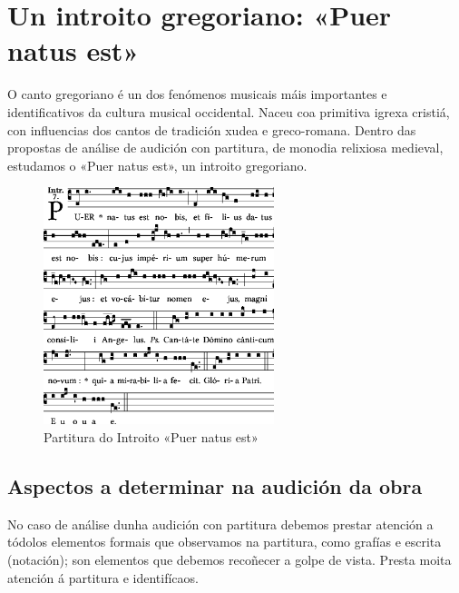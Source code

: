 %
%
\section{Un introito gregoriano: «Puer natus est»}
%
O canto gregoriano é un dos fenómenos musicais máis importantes e identificativos da cultura 
musical occidental. Naceu coa primitiva igrexa cristiá, con influencias dos cantos de tradición 
xudea e greco-romana.
%
Dentro das propostas de análise de audición con partitura, de monodia relixiosa medieval, estudamos o «Puer natus est», un introito gregoriano.

\vspace*{0.25cm}

\begin{figure}[h]
    \centering
    \includegraphics[width=0.60\textwidth]{figures/audicions/Puer-natus.eps}
    \caption{Partitura do Introito «Puer natus est»}
    \label{fig:puer-natus}
\end{figure}
%
\subsection*{Aspectos a determinar na audición da obra}
%
%
No caso de análise dunha audición con partitura debemos prestar atención a tódolos elementos formais que observamos na partitura, como grafías e escrita (notación); son elementos que debemos recoñecer a golpe de vista. Presta moita atención á partitura e identifícaos.


